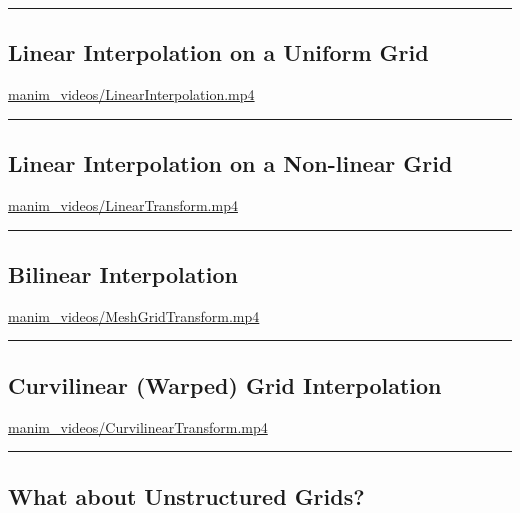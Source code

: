 \documentclass[
  letterpaper,
  DIV=11,
  numbers=noendperiod]{scrartcl}
\begin{document}
\begin{center}\rule{0.5\linewidth}{0.5pt}\end{center}

\hypertarget{linear-interpolation-on-a-uniform-grid}{%
\subsection{Linear Interpolation on a Uniform
Grid}\label{linear-interpolation-on-a-uniform-grid}}

\url{manim_videos/LinearInterpolation.mp4}

\begin{center}\rule{0.5\linewidth}{0.5pt}\end{center}

\hypertarget{linear-interpolation-on-a-non-linear-grid}{%
\subsection{Linear Interpolation on a Non-linear
Grid}\label{linear-interpolation-on-a-non-linear-grid}}

\url{manim_videos/LinearTransform.mp4}

\begin{center}\rule{0.5\linewidth}{0.5pt}\end{center}

\hypertarget{bilinear-interpolation}{%
\subsection{Bilinear Interpolation}\label{bilinear-interpolation}}

\url{manim_videos/MeshGridTransform.mp4}

\begin{center}\rule{0.5\linewidth}{0.5pt}\end{center}

\hypertarget{curvilinear-warped-grid-interpolation}{%
\subsection{Curvilinear (Warped) Grid
Interpolation}\label{curvilinear-warped-grid-interpolation}}

\url{manim_videos/CurvilinearTransform.mp4}

\begin{center}\rule{0.5\linewidth}{0.5pt}\end{center}

\hypertarget{what-about-unstructured-grids}{%
\subsection{What about Unstructured
Grids?}\label{what-about-unstructured-grids}}
\end{document}
